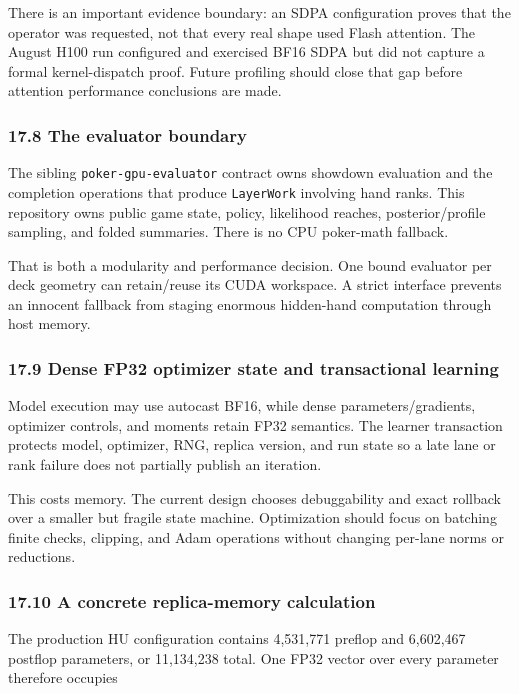 \documentclass[
  10pt,
  letterpaper,
]{article}
\begin{document}
There is an important evidence boundary: an SDPA configuration proves
that the operator was requested, not that every real shape used Flash
attention. The August H100 run configured and exercised BF16 SDPA but
did not capture a formal kernel-dispatch proof. Future profiling should
close that gap before attention performance conclusions are made.

\subsubsection{17.8 The evaluator
boundary}\label{178-the-evaluator-boundary}

The sibling \texttt{poker-gpu-evaluator} contract owns showdown
evaluation and the completion operations that produce \texttt{LayerWork}
involving hand ranks. This repository owns public game state, policy,
likelihood reaches, posterior/profile sampling, and folded summaries.
There is no CPU poker-math fallback.

That is both a modularity and performance decision. One bound evaluator
per deck geometry can retain/reuse its CUDA workspace. A strict
interface prevents an innocent fallback from staging enormous
hidden-hand computation through host memory.

\subsubsection{17.9 Dense FP32 optimizer state and transactional
learning}\label{179-dense-fp32-optimizer-state-and-transactional-learning}

Model execution may use autocast BF16, while dense parameters/gradients,
optimizer controls, and moments retain FP32 semantics. The learner
transaction protects model, optimizer, RNG, replica version, and run
state so a late lane or rank failure does not partially publish an
iteration.

This costs memory. The current design chooses debuggability and exact
rollback over a smaller but fragile state machine. Optimization should
focus on batching finite checks, clipping, and Adam operations without
changing per-lane norms or reductions.

\subsubsection{17.10 A concrete replica-memory
calculation}\label{1710-a-concrete-replica-memory-calculation}

The production HU configuration contains 4,531,771 preflop and 6,602,467
postflop parameters, or 11,134,238 total. One FP32 vector over every
parameter therefore occupies
\end{document}
